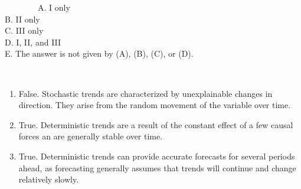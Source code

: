 \documentclass[
]{article}
\begin{document}
~~~~~~~~A. I only\\
\hspace*{0.333em}\hspace*{0.333em}\hspace*{0.333em}\hspace*{0.333em}\hspace*{0.333em}\hspace*{0.333em}\hspace*{0.333em}\hspace*{0.333em}B.
II only\\
\hspace*{0.333em}\hspace*{0.333em}\hspace*{0.333em}\hspace*{0.333em}\hspace*{0.333em}\hspace*{0.333em}\hspace*{0.333em}\hspace*{0.333em}C.
III only\\
\hspace*{0.333em}\hspace*{0.333em}\hspace*{0.333em}\hspace*{0.333em}\hspace*{0.333em}\hspace*{0.333em}\hspace*{0.333em}\hspace*{0.333em}D.
I, II, and III\\
\hspace*{0.333em}\hspace*{0.333em}\hspace*{0.333em}\hspace*{0.333em}\hspace*{0.333em}\hspace*{0.333em}\hspace*{0.333em}\hspace*{0.333em}E.
The answer is not given by (A), (B), (C), or (D).

\setlength{\leftskip}{0cm}\\

\setlength{\leftskip}{2cm}

\begin{enumerate}
\def\labelenumi{\Roman{enumi}.}
\item
  False. Stochastic trends are characterized by unexplainable changes in
  direction. They arise from the random movement of the variable over
  time.
\item
  True. Deterministic trends are a result of the constant effect of a
  few causal forces an are generally stable over time.
\item
  True. Deterministic trends can provide accurate forecasts for several
  periods ahead, as forecasting generally assumes that trends will
  continue and change relatively slowly.
\end{enumerate}
\end{document}
